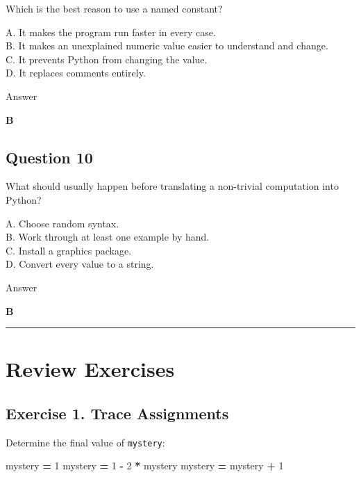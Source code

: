 \documentclass[
]{article}
\newenvironment{Shaded}{\begin{snugshade}}{\end{snugshade}}
\newcommand{\DecValTok}[1]{\textcolor[rgb]{0.00,0.00,0.81}{#1}}
\newcommand{\NormalTok}[1]{#1}
\newcommand{\OperatorTok}[1]{\textcolor[rgb]{0.81,0.36,0.00}{\textbf{#1}}}
\begin{document}
Which is the best reason to use a named constant?

A. It makes the program run faster in every case.\\
B. It makes an unexplained numeric value easier to understand and
change.\\
C. It prevents Python from changing the value.\\
D. It replaces comments entirely.

Answer

\textbf{B}

\subsection{Question 10}\label{question-10}

What should usually happen before translating a non-trivial computation
into Python?

A. Choose random syntax.\\
B. Work through at least one example by hand.\\
C. Install a graphics package.\\
D. Convert every value to a string.

Answer

\textbf{B}

\begin{center}\rule{0.5\linewidth}{0.5pt}\end{center}

\section{Review Exercises}\label{review-exercises}

\subsection{Exercise 1. Trace
Assignments}\label{exercise-1.-trace-assignments}

Determine the final value of \texttt{mystery}:

\begin{Shaded}
\begin{Highlighting}[]
\NormalTok{mystery }\OperatorTok{=} \DecValTok{1}
\NormalTok{mystery }\OperatorTok{=} \DecValTok{1} \OperatorTok{{-}} \DecValTok{2} \OperatorTok{*}\NormalTok{ mystery}
\NormalTok{mystery }\OperatorTok{=}\NormalTok{ mystery }\OperatorTok{+} \DecValTok{1}
\end{Highlighting}
\end{Shaded}
\end{document}
